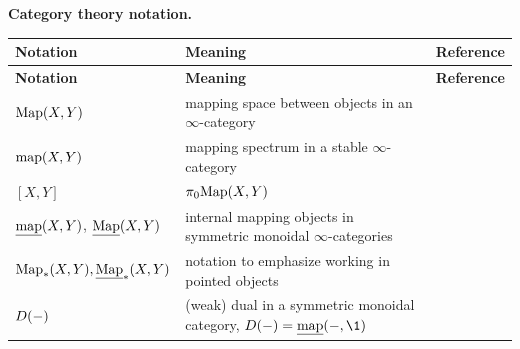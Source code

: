 \documentclass{amsart}
\numberwithin{proposition}{section}
\numberwithin{equation}{section}
\def\imap{\ul{\mathrm{map}}}
\begin{document}
\medskip
\noindent\textbf{Category theory notation.}
\renewcommand{\arraystretch}{1.15}
\begin{longtable}{@{}>{\raggedright\arraybackslash}p{}>{\raggedright\arraybackslash}p{}>{\raggedright\arraybackslash}p{}@{}}
\textbf{Notation} & \textbf{Meaning} & \textbf{Reference} \\
\hline
\endfirsthead
\textbf{Notation} & \textbf{Meaning} & \textbf{Reference} \\
\hline
\endhead
$\mathrm{Map}(X,Y)$ & mapping space between objects in an $\infty$-category \\
$\mathrm{map}(X,Y)$ & mapping spectrum in a stable $\infty$-category \\
$[X,Y]$ & $\pi_0\mathrm{Map}(X,Y)$ \\
$\imap(X,Y)$, $\underline{\mathrm{Map}}(X,Y)$ & internal mapping objects in symmetric monoidal $\infty$-categories \\
$\mathrm{Map}_*(X,Y), \underline{\mathrm{Map}}_*(X,Y)$ & notation to emphasize working in pointed objects \\
$D(\mathord-)$ & (weak) dual in a symmetric monoidal category, $D(\ph) = \imap(\ph, \1)$ \\
\end{longtable}
\end{document}
